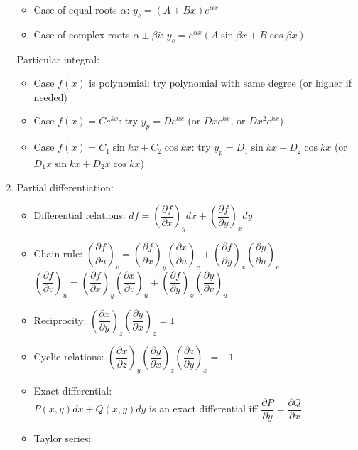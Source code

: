 \documentclass[fleqn]{article}
\begin{document}
\begin{enumerate}
\begin{itemize}[noitemsep, topsep=0pt]
            \item Case of equal roots $\alpha$: $y_c=(A+Bx)e^{\alpha x}$
            \item Case of complex roots $\alpha\pm\beta i$: $y_c=e^{\alpha x}(A\sin\beta x+B\cos\beta x)$
        \end{itemize}
        Particular integral: 
        \begin{itemize}[noitemsep, topsep=0pt]
            \item Case $f(x)$ is polynomial: try polynomial with same degree (or higher if needed)
            \item Case $f(x)=Ce^{kx}$: try $y_p=De^{kx}$ (or $Dxe^{kx}$, or $Dx^2e^{kx}$)
            \item Case $f(x)=C_1\sin{kx}+C_2\cos{kx}$: try $y_p=D_1\sin{kx}+D_2\cos{kx}$ (or $D_1x\sin{kx}+D_2x\cos{kx}$)
        \end{itemize}
    \item Partial differentiation:
        \begin{itemize}[topsep=0pt]
            \item Differential relations:\smallbreak
                $df=\left(\dfrac{\partial f}{\partial x}\right)_ydx+\left(\dfrac{\partial f}{\partial y}\right)_xdy$
            \item Chain rule:\smallbreak
                $\left(\dfrac{\partial f}{\partial u}\right)_v=\left(\dfrac{\partial f}{\partial x}\right)_y\left(\dfrac{\partial x}{\partial u}\right)_v+\left(\dfrac{\partial f}{\partial y}\right)_x\left(\dfrac{\partial y}{\partial u}\right)_v$\smallbreak
                $\left(\dfrac{\partial f}{\partial v}\right)_u=\left(\dfrac{\partial f}{\partial x}\right)_y\left(\dfrac{\partial x}{\partial v}\right)_u+\left(\dfrac{\partial f}{\partial y}\right)_x\left(\dfrac{\partial y}{\partial v}\right)_u$
            \item Reciprocity:\smallbreak
                $\left(\dfrac{\partial x}{\partial y}\right)_z\left(\dfrac{\partial y}{\partial x}\right)_z=1$
            \item Cyclic relations:\smallbreak
                $\left(\dfrac{\partial x}{\partial z}\right)_y\left(\dfrac{\partial y}{\partial x}\right)_z\left(\dfrac{\partial z}{\partial y}\right)_x=-1$
            \item Exact differential:\\
                $P(x,y)dx+Q(x,y)dy$ is an exact differential iff $\dfrac{\partial P}{\partial y}=\dfrac{\partial Q}{\partial x}$.
            \item Taylor series:\smallbreak

\end{itemize}
\end{enumerate}
\end{document}
